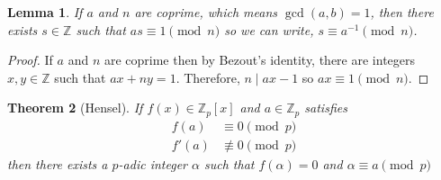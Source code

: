 \documentclass{article}
\newcommand{\divides}{\mid}
\newcommand{\Z}{\mathbb{Z}}
\theoremstyle{theorem}
\newtheorem{theorem}{Theorem}[section]
\newtheorem{lemma}[theorem]{Lemma}
\theoremstyle{definition}
\theoremstyle{definition}
\theoremstyle{remark}
\theoremstyle{definition}
\theoremstyle{remark}
\begin{document}
\begin{lemma}
If $a$ and $n$ are coprime, which means $\gcd(a,b) = 1$, then there exists $s \in \Z$ such that $as \equiv 1 \pmod{n}$ so we can write, $s \equiv a^{-1} \pmod{n}$.
\end{lemma}

\begin{proof}
If $a$ and $n$ are coprime then by Bezout's identity, there are integers $x, y \in \Z$ such that $ax + ny = 1$. Therefore, $n \divides ax - 1$ so $ax \equiv 1 \pmod{n}$.
\end{proof}

\begin{theorem}[Hensel] If $f(x) \in \mathbb{Z}_p[x]$ and $a \in \mathbb{Z}_p$ satisfies
\begin{align*}
f(a) &\equiv 0 \pmod p \\
f'(a) &\not\equiv 0 \pmod p
\end{align*}
then there exists a $p$-adic integer $\alpha$ such that $f(\alpha) = 0$ and $\alpha \equiv a \pmod p$
\end{theorem}
\end{document}
